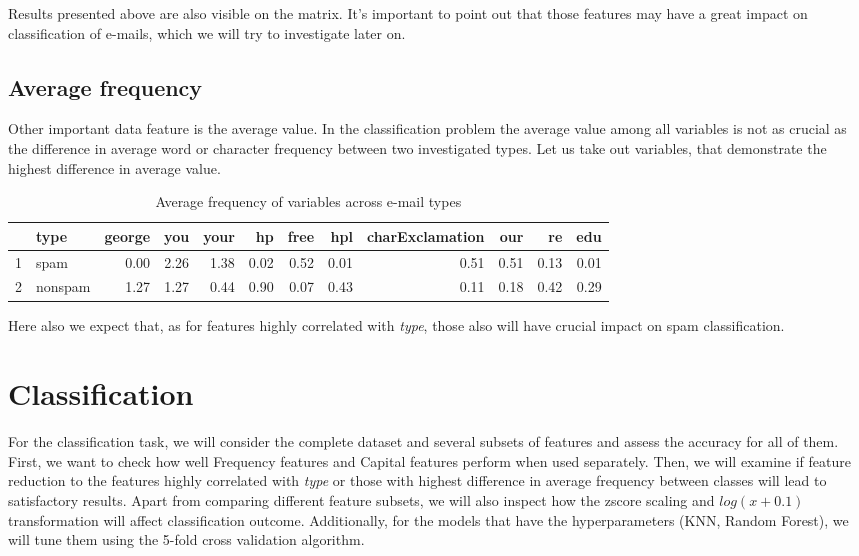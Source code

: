 \documentclass{article}\usepackage[]{graphicx}\usepackage[]{xcolor}
\begin{document}
Results presented above are also visible on the matrix. It's important to point 
out that those features may have a great impact on classification of e-mails,
which we will try to investigate later on.
	
\subsection*{Average frequency}
	
Other important data feature is the average value. In the classification problem 
the average value among all variables is not as crucial as the difference in average 
word or character frequency between two investigated types. Let us take out variables, 
that demonstrate the highest difference in average value.

\begin{table}[ht]
\centering
\begin{tabular}{rlrrrrrrrrrr}
  \hline
 & type & george & you & your & hp & free & hpl & charExclamation & our & re & edu \\ 
  \hline
1 & spam & 0.00 & 2.26 & 1.38 & 0.02 & 0.52 & 0.01 & 0.51 & 0.51 & 0.13 & 0.01 \\ 
  2 & nonspam & 1.27 & 1.27 & 0.44 & 0.90 & 0.07 & 0.43 & 0.11 & 0.18 & 0.42 & 0.29 \\ 
   \hline
\end{tabular}
\caption{Average frequency of variables across e-mail types} 
\label{tab3}
\end{table}


Here also we expect that, as for features highly correlated with \textit{type}, those also will have crucial impact on spam classification.

\clearpage


\section{Classification}

For the classification task, we will consider the complete dataset and several 
subsets of features and assess the accuracy for all of them. First, we want to check
how well Frequency features and Capital features perform when used separately. 
Then, we will examine if feature reduction to the features highly correlated with \textit{type}
or those with highest difference in average frequency between classes will lead 
to satisfactory results. Apart from comparing different feature subsets, we will also
inspect how the zscore scaling and $log(x+0.1)$ transformation will affect classification
outcome. Additionally, for the models that have the hyperparameters (KNN, Random Forest), we will tune them
using the 5-fold cross validation algorithm.
\end{document}
